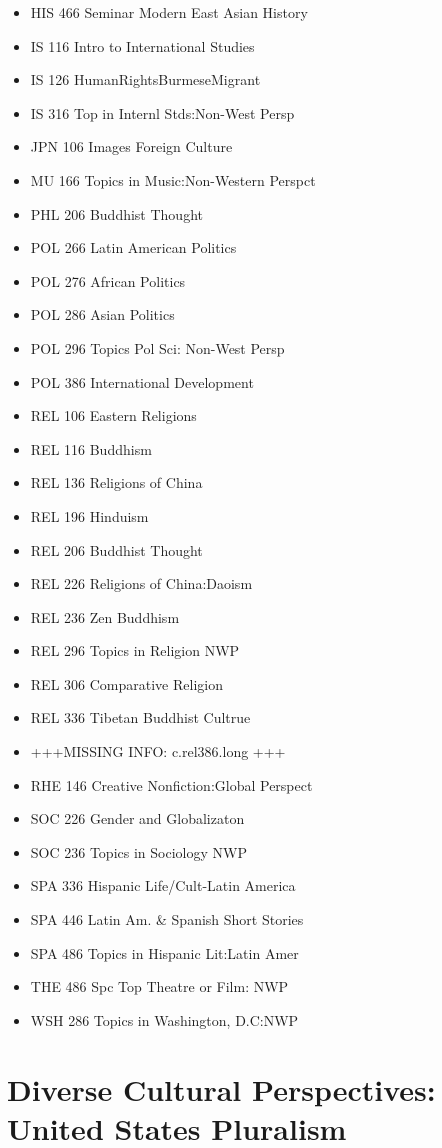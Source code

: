 \documentclass[
  letterpaper,
]{scrbook}
\begin{document}
\begin{itemize}
\item
  HIS 466 Seminar Modern East Asian History
\item
  IS 116 Intro to International Studies
\item
  IS 126 HumanRightsBurmeseMigrant
\item
  IS 316 Top in Internl Stds:Non-West Persp
\item
  JPN 106 Images Foreign Culture
\item
  MU 166 Topics in Music:Non-Western Perspct
\item
  PHL 206 Buddhist Thought
\item
  POL 266 Latin American Politics
\item
  POL 276 African Politics
\item
  POL 286 Asian Politics
\item
  POL 296 Topics Pol Sci: Non-West Persp
\item
  POL 386 International Development
\item
  REL 106 Eastern Religions
\item
  REL 116 Buddhism
\item
  REL 136 Religions of China
\item
  REL 196 Hinduism
\item
  REL 206 Buddhist Thought
\item
  REL 226 Religions of China:Daoism
\item
  REL 236 Zen Buddhism
\item
  REL 296 Topics in Religion NWP
\item
  REL 306 Comparative Religion
\item
  REL 336 Tibetan Buddhist Cultrue
\item
  +++MISSING INFO: c.rel386.long +++
\item
  RHE 146 Creative Nonfiction:Global Perspect
\item
  SOC 226 Gender and Globalizaton
\item
  SOC 236 Topics in Sociology NWP
\item
  SPA 336 Hispanic Life/Cult-Latin America
\item
  SPA 446 Latin Am. \& Spanish Short Stories
\item
  SPA 486 Topics in Hispanic Lit:Latin Amer
\item
  THE 486 Spc Top Theatre or Film: NWP
\item
  WSH 286 Topics in Washington, D.C:NWP
\end{itemize}

\section{Diverse Cultural Perspectives: United States
Pluralism}\label{sec-diverse-cultural-perspectives-united-states}
\end{document}
